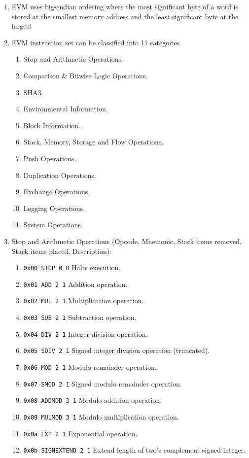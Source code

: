 \begin{enumerate}
\item EVM uses big-endian ordering where the most significant byte of a word is stored at the smallest memory address and the least significant byte at the largest

\item EVM instruction set can be classified into 11 categories
\begin{enumerate}
\item Stop and Arithmetic Operations.
\item Comparison \& Bitwise Logic Operations.
\item SHA3.
\item Environmental Information.
\item Block Information.
\item Stack, Memory, Storage and Flow Operations.
\item Push Operations.
\item Duplication Operations.
\item Exchange Operations.
\item Logging Operations.
\item System Operations.
\end{enumerate}

\item Stop and Arithmetic Operations (Opcode, Mnemonic, Stack items removed, Stack items placed, Description):
\begin{enumerate}
\item\verb|0x00 STOP 0 0| Halts execution.
\item\verb|0x01 ADD 2 1| Addition operation.
\item\verb|0x02 MUL 2 1| Multiplication operation.
\item\verb|0x03 SUB 2 1| Subtraction operation.
\item\verb|0x04 DIV 2 1| Integer division operation.
\item\verb|0x05 SDIV 2 1| Signed integer division operation (truncated).
\item\verb|0x06 MOD 2 1| Modulo remainder operation.
\item\verb|0x07 SMOD 2 1| Signed modulo remainder operation.
\item\verb|0x08 ADDMOD 3 1| Modulo addition operation.
\item\verb|0x09 MULMOD 3 1| Modulo multiplication operation.
\item\verb|0x0a EXP 2 1| Exponential operation.
\item\verb|0x0b SIGNEXTEND 2 1| Extend length of two's complement signed integer.
\end{enumerate}


\end{enumerate}
